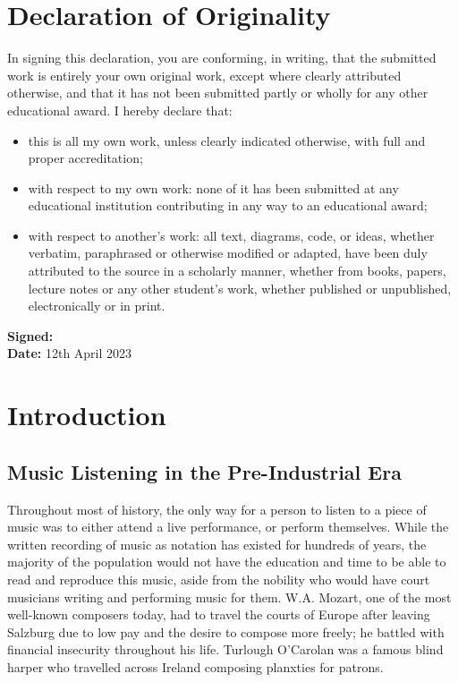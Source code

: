 \documentclass[a4paper, 12pt]{report}
\begin{document}
\chapter*{Declaration of Originality}
In signing this declaration, you are conforming, in writing, that the submitted work is entirely your own original work,
except where clearly attributed otherwise, and that it has not been submitted partly or wholly for any other educational award.
I hereby declare that:
\begin{itemize}
    \item this is all my own work, unless clearly indicated otherwise, with full and proper accreditation;
    \item with respect to my own work: none of it has been submitted at any educational institution contributing in any way to an educational award;
    \item with respect to another's work: all text, diagrams, code, or ideas, whether verbatim, paraphrased or otherwise modified or adapted, have been duly attributed to the source in a scholarly manner, whether from books, papers, lecture notes or any other student's work, whether published or unpublished, electronically or in print.
\end{itemize}
\large{\textbf{Signed:}}  \\
\large{\textbf{Date:}} 12th April 2023

\tableofcontents


\chapter{Introduction}

\section{Music Listening in the Pre-Industrial Era}
Throughout most of history, the only way for a person to listen to a piece of music was to either attend a live performance,
or perform themselves. While the written recording of music as notation has existed for hundreds of years, the majority of the population 
would not have the education and time to be able to read and reproduce this music, aside from the nobility who would have 
court musicians writing and performing music for them. W.A. Mozart, one of the most well-known composers today, had to travel the courts of Europe 
after leaving Salzburg due to low pay and the desire to compose more freely; he battled with financial insecurity throughout his life.
Turlough O'Carolan was a famous blind harper who travelled across Ireland composing planxties for patrons.
\end{document}
